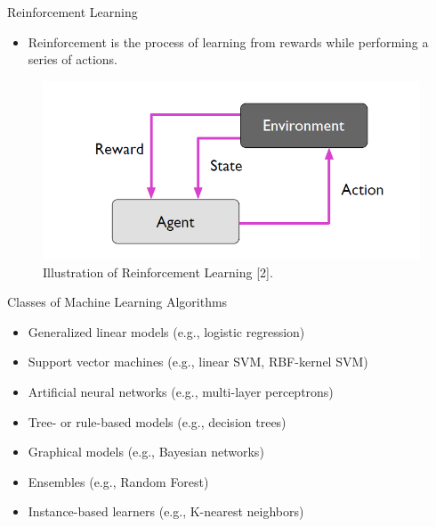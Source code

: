 \documentclass[compress,oilve]{beamer}
\begin{document}
\begin{frame}{Reinforcement Learning}
\begin{itemize}
\item Reinforcement is the process of learning from rewards while performing a series of actions.
\end{itemize}
\begin{figure}
 \centering
 \includegraphics[scale=0.75]{15}  
 \caption{Illustration of Reinforcement Learning [2].}
\end{figure}
\end{frame}

\begin{frame}{Classes of Machine Learning Algorithms}
\begin{itemize}
\item Generalized linear models (e.g., logistic regression)
\item Support vector machines (e.g., linear SVM, RBF-kernel SVM)
\item Artificial neural networks (e.g., multi-layer perceptrons)
\item Tree- or rule-based models (e.g., decision trees)
\item Graphical models (e.g., Bayesian networks)
\item Ensembles (e.g., Random Forest)
\item Instance-based learners (e.g., K-nearest neighbors)
\end{itemize}
\end{frame}
\end{document}
